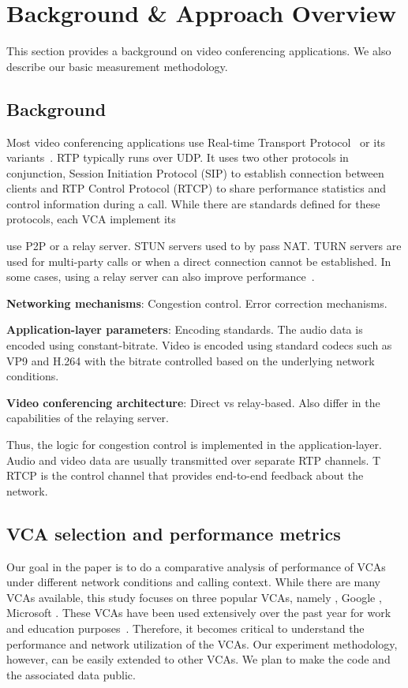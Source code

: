 \section{Background & Approach Overview}
\label{sec:background}
This section provides a background on video conferencing applications. We also describe our basic measurement methodology.

\subsection{Background}
Most video conferencing applications use Real-time Transport Protocol~\cite{schulzrinne1996rtp} or its variants~\cite{srtp, zoom}. RTP typically runs over UDP. It uses two other protocols in conjunction, Session Initiation Protocol (SIP) to establish connection between clients and RTP Control Protocol (RTCP)  to share performance statistics and control information during a call. While there are standards defined for these protocols, each VCA implement its 

use P2P or a relay server. STUN servers used to by pass NAT. TURN servers are used for multi-party calls or when a direct connection cannot be established. In some cases, using a relay server can also improve performance~\cite{via}.

\textbf{Networking mechanisms}: Congestion control. Error correction mechanisms.

\textbf{Application-layer parameters}: Encoding standards. The audio data is encoded using constant-bitrate. Video is encoded using standard codecs such as VP9 and H.264 with the bitrate controlled based on the underlying network conditions.

\textbf{Video conferencing architecture}: Direct vs relay-based. Also differ in the capabilities of the relaying server. 




Thus, the logic for congestion control is implemented in the application-layer. Audio and video data are usually transmitted over separate RTP channels. T RTCP is the control channel that provides end-to-end feedback about the network. 



\subsection{VCA selection and performance metrics}
Our goal in the paper is to do a comparative analysis of performance of VCAs under different network conditions and calling context. While there are many VCAs available, this study focuses on three popular VCAs, namely \zoom, Google \meet, Microsoft \teams. These VCAs have been used extensively over the past year for work and education purposes~\cite{}. Therefore, it becomes critical to understand the performance and network utilization of the VCAs. Our experiment methodology, however, can be easily extended to other VCAs. We plan to make the code and the associated data public. 



